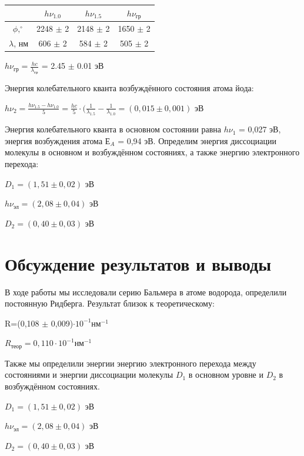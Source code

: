 \documentclass[12pt,a4paper]{article}
\begin{document}
\begin{center}
\begin{tabular}{|c|c|c|c|}
\hline 
 & $h\nu_{1.0}$ & $h\nu_{1.5}$ & $h\nu_\text{гр}$ \\ 
\hline 
$\phi, ^\circ$ & 2248 $\pm$ 2 & 2148 $\pm$ 2 & 1650 $\pm$ 2 \\ 
\hline 
$\lambda$, нм & 606 $\pm$ 2 & 584 $\pm$ 2 & 505 $\pm$ 2 \\ 
\hline 
\end{tabular} 
\end{center}

\begin{large}
$h\nu_\text{гр} = \frac{hc}{\lambda_\text{гр}}$ = 2.45 $\pm$ 0.01 эВ
\end{large}

Энергия колебательного кванта возбуждённого состояния атома йода:

\begin{large}
$h\nu_2=\frac{h\nu_{1.5}-h\nu_{1.0}}{5}=\frac{hc}{5}\cdot(\frac{1}{\lambda_{1.5}} - \frac{1}{\lambda_{1.0}} = (0,015 \pm 0,001)$  эВ
\end{large}

	Энергия колебательного кванта в основном состоянии равна $h\nu_1$ = 0,027 эВ, энергия возбуждения атома $Е_{A}$ = 0,94 эВ. Определим энергия диссоциации молекулы в основном и возбуждённом состояниях, а также энергию электронного перехода:
    
\begin{large} 
$D_1 = (1,51 \pm 0,02)$  эВ

$h\nu_\text{эл} = (2,08 \pm 0,04)$  эВ

$D_2 = (0,40 \pm 0,03)$  эВ
\end{large}

\section{Обсуждение результатов и выводы}
	
  
     В ходе работы мы исследовали серию Бальмера в атоме водорода, определили постоянную Ридберга. Результат близок к теоретическому:
    
\begin{large}     
R=(0,108 $\pm$ 0,009)$\cdot 10^{-1} \text{нм}^{-1}$

$R_\text{теор} = 0,110 \cdot 10^{-1} \text{нм}^{-1}$
\end{large}

     Также мы определили энергии энергию электронного перехода между состояниями и энергии диссоциации молекулы $D_1$ в основном уровне и $D_2$ в возбуждённом состояниях.

\begin{large}
$D_1 = (1,51 \pm 0,02)$  эВ

$h\nu_\text{эл} = (2,08 \pm 0,04)$  эВ

$D_2 = (0,40 \pm 0,03)$  эВ
\end{large}
\end{document}

